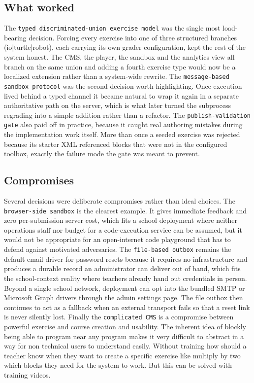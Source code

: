\subsection{What worked}
The \texttt{typed discriminated-union exercise model} was the single most load-bearing decision. 
Forcing every exercise into one of three structured branches (io|turtle|robot), each carrying its own grader configuration, 
kept the rest of the system honest. The CMS, the player, the sandbox and the analytics view all branch on the same union and 
adding a fourth exercise type would now be a localized extension rather than a system-wide rewrite.
The \texttt{message-based sandbox protocol} was the second decision worth highlighting. Once execution lived behind a 
typed channel it became natural to wrap it again in a separate authoritative path on the server, which is what later 
turned the subprocess regrading into a simple addition rather than a refactor.
The \texttt{publish-validation gate} also paid off in practice, because it caught real authoring mistakes during the 
implementation work itself. More than once a seeded exercise was rejected because its starter XML referenced blocks 
that were not in the configured toolbox, exactly the failure mode the gate was meant to prevent.

\subsection{Compromises}
Several decisions were deliberate compromises rather than ideal choices. The \texttt{browser-side sandbox} is the clearest
example. It gives immediate feedback and zero per-submission server cost, which fits a school deployment where 
neither operations staff nor budget for a code-execution service can be assumed, but it would not be appropriate 
for an open-internet code playground that has to defend against motivated adversaries.
The \texttt{file-based outbox} remains the default email driver for password resets because it requires no infrastructure 
and produces a durable record an administrator can deliver out of band, which fits the school-context reality where 
teachers already hand out credentials in person. Beyond a single school network, deployment can opt into the bundled 
SMTP or Microsoft Graph drivers through the admin settings page.
The file outbox then continues to act as a fallback when an external transport fails so that a reset link is never silently lost.
Finally the \texttt{complicated CMS} is a compromise between powerful exercise and course creation and usability.
The inherent idea of blockly being able to program near any program makes it very difficult to abstract in a way for 
non technical users to understand easily. Without training how should a teacher know when they want to create a specific 
exercise like multiply by two which blocks they need for the system to work. But this can be solved with training videos.

